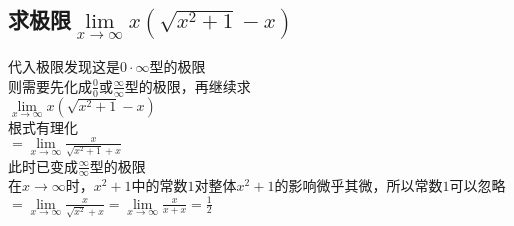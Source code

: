 \documentclass{article}
\begin{document}
\begin{flushleft}
\subsection{
求极限$\lim\limits_{x\to \infty}x(\sqrt{x^2+1}-x)$
}
代入极限发现这是$0\cdot\infty$型的极限\\
则需要先化成$\frac{0}{0}$或$\frac{\infty}{\infty}$型的极限，再继续求\\
$\lim\limits_{x\to \infty}x(\sqrt{x^2+1}-x)$\\
根式有理化\\
$=\lim\limits_{x\to \infty}\frac{x}{\sqrt{x^2+1}+x}$\\
此时已变成$\frac{\infty}{\infty}$型的极限\\
在$x\to\infty$时，$x^2+1$中的常数$1$对整体$x^2+1$的影响微乎其微，所以常数$1$可以忽略\\
$=\lim\limits_{x\to \infty}\frac{x}{\sqrt{x^2}+x}
=\lim\limits_{x\to \infty}\frac{x}{x+x}=\frac{1}{2}$\\



\end{flushleft}
\end{document}
